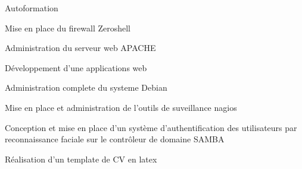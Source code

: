 



\begin{cventries}



\cventry
{Autoformation} %
{} %
{} %
{} %
{ %
\begin{cvitems}
\item {Mise en place du firewall Zeroshell}
\item {Administration du serveur web APACHE}
\item {Développement d'une applications web}
\item {Administration complete du systeme Debian}
\item {Mise en place et administration de l'outils de suveillance nagios}
\item {Conception et mise en place d’un système d’authentification des utilisateurs par reconnaissance faciale sur le contrôleur de domaine SAMBA}
\item {Réalisation d'un template de CV en latex}
\end{cvitems}
}

\end{cventries}






